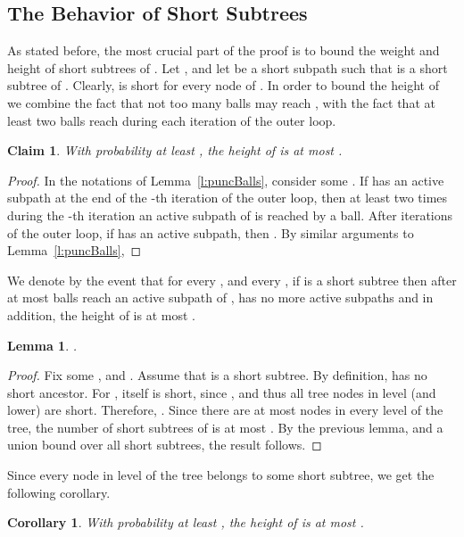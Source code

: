 \documentclass[twoside,leqno,twocolumn]{article}
\newtheorem{claim}[lemma]{Claim}
\newtheorem{lemma}[theorem]{Lemma}
\newtheorem{corollary}[theorem]{Corollary}
\newtheorem{claim}[theorem]{Claim}
\begin{document}
\subsection{The Behavior of Short Subtrees} \label{subsec:short}
As stated before, the most crucial part of the proof is to bound the weight and height of short subtrees of .
Let , and let  be a short subpath such that  is a short subtree of .
Clearly,  is short for every node  of . 
In order to bound the height of  we combine the fact that not too many balls may reach , with the fact that at least two balls reach  during each iteration of the outer loop. 
\begin{claim}
With probability at least , the height of  is at most .
\end{claim}
\begin{proof}
In the notations of Lemma~\ref{l:puncBalls}, consider some .
If  has an active subpath at the end of the -th iteration of the outer loop, then at least two times during the -th iteration an active subpath of  is reached by a ball. 
After  iterations of the outer loop, if  has an active subpath, then .
By similar arguments to Lemma~\ref{l:puncBalls}, 

\end{proof}
We denote by  the event that for every , and every , if  is a short subtree then after at most  balls reach an active subpath of ,  has no more active subpaths and in addition, the height of  is at most .
\begin{lemma} \label{l:shortReach}
.
\end{lemma}
\begin{proof}
Fix some , and . Assume that  is a short subtree. By definition,  has no short ancestor.
For ,  itself is short, since , and thus all tree nodes in level  (and lower) are short.  Therefore, . Since there are at most  nodes in every level of the tree, the number of short subtrees of  is at most . By the previous lemma, and a union bound over all short subtrees, the result follows.
\end{proof}

Since every node in level  of the tree belongs to some short subtree, we get the following corollary.
\begin{corollary} \label{c:height}
With probability at least , the height of  is at most .
\end{corollary}
\end{document}

